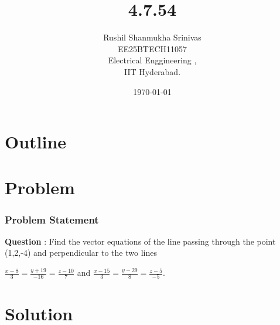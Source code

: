 \documentclass{beamer}
\title{4.7.54}
\author{Rushil Shanmukha Srinivas \\EE25BTECH11057 \\ Electrical Enggineering ,\\IIT Hyderabad.}
\date{\today}
\theoremstyle{remark}
\numberwithin{equation}{section}
\begin{document}
 

\begin{frame}
\titlepage
\end{frame}

\section*{Outline}
\begin{frame}
\tableofcontents
\end{frame}
\section{Problem}
\begin{frame}
\frametitle{Problem Statement}
\textbf{Question} : Find the vector equations of the line passing through the point (1,2,-4) and  perpendicular to the two lines 

$\frac{x-8}{3} = \frac{y+19}{-16} = \frac{z-10}{7}$ and
$\frac{x-15}{3} = \frac{y-29}{8} = \frac{z-5}{-5}$.
\end{frame}
\section{Solution}
\end{document}
